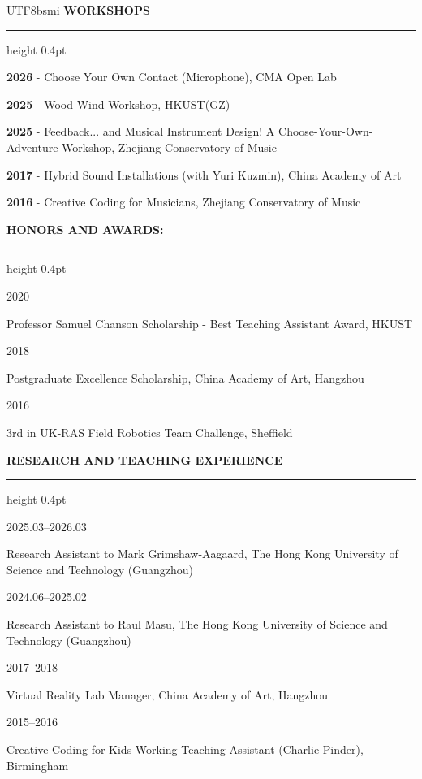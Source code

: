 \documentclass[10pt,letterpaper]{article}
\newcommand{\cvsection}[1]{%
  \vspace{1.05em}%
  {\bfseries\MakeUppercase{#1}}\par
  \vspace{0.2em}%
  \hrule height 0.4pt
  \vspace{0.55em}%
}
\newcommand{\yearitem}[2]{%
  \hspace{1.1em}\parbox[t]{0.96\textwidth}{\raggedright #1 - #2}\par
}
\newcommand{\dateditem}[2]{%
  \hspace{1.1em}%
  \begin{minipage}[t]{0.17\textwidth}\raggedright #1\end{minipage}%
  \hspace{0.6em}%
  \begin{minipage}[t]{0.74\textwidth}\raggedright #2\end{minipage}\par
}
\begin{document}
\begin{CJK*}{UTF8}{bsmi}
\cvsection{Workshops}

\yearitem{\textbf{2026}}{Choose Your Own Contact (Microphone), CMA Open Lab}
\yearitem{\textbf{2025}}{Wood Wind Workshop, HKUST(GZ)}
\yearitem{\textbf{2025}}{Feedback... and Musical Instrument Design! A Choose-Your-Own-Adventure Workshop, Zhejiang Conservatory of Music}
\yearitem{\textbf{2017}}{Hybrid Sound Installations (with Yuri Kuzmin), China Academy of Art}
\yearitem{\textbf{2016}}{Creative Coding for Musicians, Zhejiang Conservatory of Music}

\cvsection{Honors and Awards:}

\dateditem{2020}{Professor Samuel Chanson Scholarship - Best Teaching Assistant Award, HKUST}
\dateditem{2018}{Postgraduate Excellence Scholarship, China Academy of Art, Hangzhou}
\dateditem{2016}{3rd in UK-RAS Field Robotics Team Challenge, Sheffield}

\cvsection{Research and Teaching Experience}

\dateditem{2025.03--2026.03}{Research Assistant to Mark Grimshaw-Aagaard, The Hong Kong University of Science and Technology (Guangzhou)}
\dateditem{2024.06--2025.02}{Research Assistant to Raul Masu, The Hong Kong University of Science and Technology (Guangzhou)}
\dateditem{2017--2018}{Virtual Reality Lab Manager, China Academy of Art, Hangzhou}
\dateditem{2015--2016}{Creative Coding for Kids Working Teaching Assistant (Charlie Pinder), Birmingham}

\end{CJK*}
\end{document}
